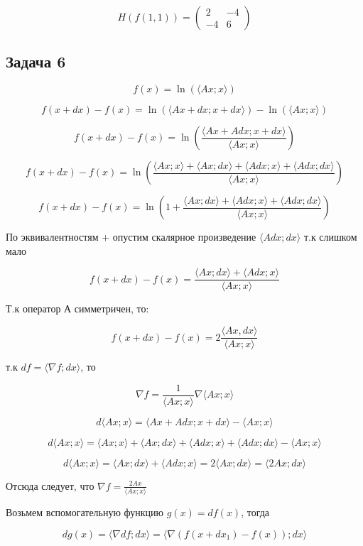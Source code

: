 \documentclass[a4paper,12pt]{article}
\begin{document}
\[
    H(f(1, 1)) = \begin{pmatrix}
    2 & -4 \\
    -4 & 6
    \end{pmatrix}
\]

\subsection{Задача 6}
\[
f(x) = \ln(\langle Ax; x\rangle)
\]

\[
f(x+dx) - f(x) = \ln(\langle Ax+dx; x+dx\rangle) - \ln(\langle Ax; x \rangle)
\]

\[
f(x+dx) - f(x) = \ln(\frac{\langle Ax+Adx; x+dx\rangle}{\langle Ax; x \rangle})
\]

\[
f(x+dx) - f(x) =  \ln(\frac{\langle Ax; x \rangle + \langle Ax; dx \rangle + \langle Adx; x \rangle + \langle Adx; dx \rangle }{\langle Ax; x \rangle})
\]

\[
f(x+dx) - f(x) =  \ln(1 + \frac{ \langle Ax; dx \rangle + \langle Adx; x \rangle + \langle Adx; dx \rangle}{\langle Ax; x \rangle})
\]

По эквивалентностям + опустим скалярное произведение $\langle Adx; dx \rangle$ т.к слишком мало

\[
f(x+dx) - f(x) =  \frac{ \langle Ax; dx \rangle + \langle Adx; x \rangle}{\langle Ax; x \rangle}
\]

Т.к оператор А симметричен, то:

\[
f(x+dx) - f(x) = 2 \frac{\langle Ax, dx \rangle}{\langle Ax; x \rangle}
\]

т.к $df = \langle \nabla f; dx \rangle$, то

\[
\nabla f = \frac{1}{\langle Ax; x \rangle} \nabla \langle Ax; x \rangle
\]

\[
d\langle Ax; x \rangle = \langle Ax + Adx; x + dx \rangle - \langle Ax; x \rangle
\]


\[
d\langle Ax; x \rangle = \langle Ax; x \rangle + \langle Ax; dx \rangle + \langle Adx; x \rangle + \langle Adx; dx \rangle - \langle Ax; x \rangle
\]

\[
d\langle Ax; x \rangle = \langle Ax; dx \rangle + \langle Adx; x \rangle = 2 \langle Ax; dx \rangle = \langle 2Ax; dx \rangle
\]

Отсюда следует, что $\nabla f = \frac{2Ax}{\langle Ax; x \rangle}$

Возьмем вспомогательную функцию $g(x) = df(x)$, тогда

\[
dg(x) = \langle \nabla df; dx \rangle = \langle \nabla (f(x+dx_1)-f(x)); dx \rangle
\]
\end{document}
